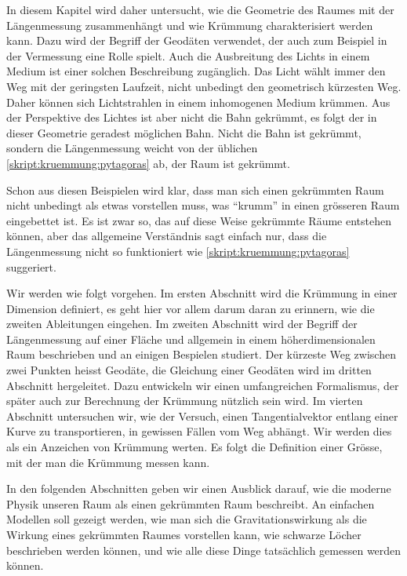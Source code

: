 In diesem Kapitel wird daher untersucht, wie die Geometrie des Raumes
mit der Längenmessung zusammenhängt und wie Krümmung charakterisiert
werden kann.
Dazu wird der Begriff der Geodäten verwendet, der auch zum Beispiel
in der Vermessung eine Rolle spielt.
Auch die Ausbreitung des Lichts in einem Medium ist einer solchen
Beschreibung zugänglich.
Das Licht wählt immer den Weg mit der geringsten Laufzeit, nicht
unbedingt den geometrisch kürzesten Weg.
Daher können sich Lichtstrahlen in einem inhomogenen Medium
krümmen.
Aus der Perspektive des Lichtes ist aber nicht die Bahn gekrümmt,
es folgt der in dieser Geometrie geradest möglichen Bahn.
Nicht die Bahn ist gekrümmt, sondern die Längenmessung weicht von
der üblichen \eqref{skript:kruemmung:pytagoras} ab, der Raum ist
gekrümmt.

Schon aus diesen Beispielen wird klar, dass man sich einen gekrümmten
Raum nicht unbedingt als etwas vorstellen muss, was ``krumm'' in einen
grösseren Raum eingebettet ist. 
Es ist zwar so, das auf diese Weise gekrümmte Räume entstehen können,
aber das allgemeine Verständnis sagt einfach nur, dass die Längenmessung
nicht so funktioniert wie \eqref{skript:kruemmung:pytagoras} suggeriert.

Wir werden wie folgt vorgehen.
Im ersten Abschnitt wird die Krümmung in einer Dimension definiert,
es geht hier vor allem darum daran zu erinnern, wie die zweiten
Ableitungen eingehen.
Im zweiten Abschnitt wird der Begriff der Längenmessung auf einer
Fläche und allgemein in einem höherdimensionalen Raum beschrieben
und an einigen Bespielen studiert.
Der kürzeste Weg zwischen zwei Punkten heisst Geodäte, die Gleichung
einer Geodäten wird im dritten Abschnitt hergeleitet.
Dazu entwickeln wir einen umfangreichen Formalismus, der später auch
zur Berechnung der Krümmung nützlich sein wird.
Im vierten Abschnitt untersuchen wir, wie der Versuch, einen Tangentialvektor
entlang einer Kurve zu transportieren, in gewissen Fällen vom 
Weg abhängt.
Wir werden dies als ein Anzeichen von Krümmung werten.
Es folgt die Definition einer Grösse, mit der man die Krümmung messen
kann.

In den folgenden Abschnitten geben wir einen Ausblick darauf, wie 
die moderne Physik unseren Raum als einen gekrümmten Raum beschreibt.
An einfachen Modellen soll gezeigt werden, wie man sich die Gravitationswirkung
als die Wirkung eines gekrümmten Raumes vorstellen kann, wie schwarze Löcher
beschrieben werden können, und wie alle diese Dinge tatsächlich gemessen
werden können.








